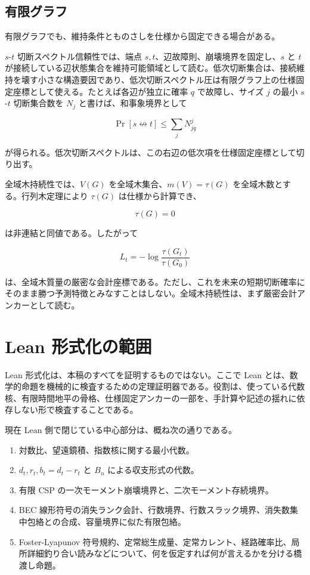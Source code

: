 \documentclass[12pt,a4paper]{article}
\begin{document}
\subsection{有限グラフ}\label{ux6709ux9650ux30b0ux30e9ux30d5}

有限グラフでも、維持条件とものさしを仕様から固定できる場合がある。

\(s\)-\(t\) 切断スペクトル信頼性では、端点 \(s,t\)、辺故障則、崩壊境界を固定し、\(s\) と \(t\) が接続している辺状態集合を維持可能領域として読む。低次切断集合は、接続維持を壊す小さな構造要因であり、低次切断スペクトル圧は有限グラフ上の仕様固定座標として使える。たとえば各辺が独立に確率 \(q\) で故障し、サイズ \(j\) の最小 \(s\)-\(t\) 切断集合数を \(N_{j}\) と書けば、和事象境界として

\[
\Pr[s\not\leftrightarrow t]\le \sum_{j} N_{jq}^j
\]

が得られる。低次切断スペクトルは、この右辺の低次項を仕様固定座標として切り出す。

全域木持続性では、\(V(G)\) を全域木集合、\(m(V)=\tau(G)\) を全域木数とする。行列木定理により \(\tau(G)\) は仕様から計算でき、

\[
\tau(G)=0
\]

は非連結と同値である。したがって

\[
L_{t}=-\log\frac{\tau(G_{t})}{\tau(G_0)}
\]

は、全域木質量の厳密な会計座標である。ただし、これを未来の短期切断確率にそのまま勝つ予測特徴とみなすことはしない。全域木持続性は、まず厳密会計アンカーとして読む。

\section{Lean 形式化の範囲}\label{lean-ux5f62ux5f0fux5316ux306eux7bc4ux56f2}

Lean 形式化は、本稿のすべてを証明するものではない。ここで Lean とは、数学的命題を機械的に検査するための定理証明器である。役割は、使っている代数核、有限時間地平の骨格、仕様固定アンカーの一部を、手計算や記述の揺れに依存しない形で検査することである。

現在 Lean 側で閉じている中心部分は、概ね次の通りである。

\begin{enumerate}
\def\labelenumi{\arabic{enumi}.}
\tightlist
\item
  対数比、望遠鏡積、指数核に関する最小代数。
\item
  \(d_{t},r_{t},b_{t}=d_{t}-r_{t}\) と \(B_{n}\) による収支形式の代数。
\item
  有限 CSP の一次モーメント崩壊境界と、二次モーメント存続境界。
\item
  BEC 線形符号の消失ランク会計、行数境界、行数スラック境界、消失数集中包絡との合成、容量境界に似た有限包絡。
\item
  Foster-Lyapunov 符号規約、定常総生成量、定常カレント、経路確率比、局所詳細釣り合い読みなどについて、何を仮定すれば何が言えるかを分ける橋渡し命題。
\end{enumerate}
\end{document}
